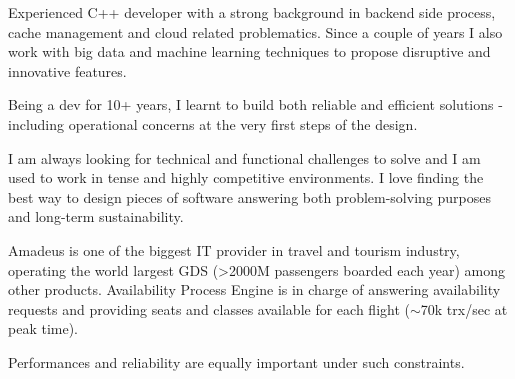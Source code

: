 \documentclass[10pt, a4paper, ragged2e]{altacv}
\begin{document}
\sloppy
{}

\begin{adjustwidth}{-3.7cm}{}
\makecvheader
\end{adjustwidth}

	Experienced C++ developer with a strong background in backend side process, cache management and cloud related problematics. Since a couple of years I also work with big data and machine learning techniques to propose disruptive and innovative features.

	\medskip
	Being a dev for 10+ years, I learnt to build both reliable and efficient solutions - including operational concerns at the very first steps of the design.

	\medskip
	I am always looking for technical and functional challenges to solve and I am used to work in tense and highly competitive environments. I love finding the best way to design pieces of software answering both problem-solving purposes and long-term sustainability.


\bigskip
{}
		
		Amadeus is one of the biggest IT provider in travel and tourism industry, operating the world largest GDS (>2000M passengers boarded each year) among other products.
		Availability Process Engine is in charge of answering availability requests and providing seats and classes available for each flight (${\sim}$70k trx/sec at peak time).

		\medskip
		Performances and reliability are equally important under such constraints.
\end{document}
